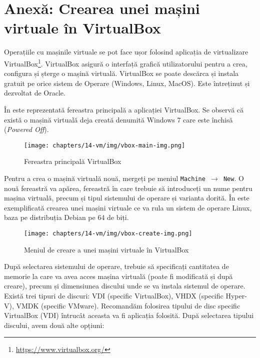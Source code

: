 \section{Anexă: Crearea unei mașini virtuale în VirtualBox}
\label{sec:vm:create-vbox}

Operațiile cu mașinile virtuale se pot face ușor folosind aplicația de virtualizare VirtualBox\footnote{\url{https://www.virtualbox.org/}}.
VirtualBox asigură o interfață grafică utilizatorului pentru a crea, configura și șterge o mașină virtuală.
VirtualBox se poate descărca și instala gratuit pe orice sistem de Operare (Windows, Linux, MacOS).
Este întreținut și dezvoltat de Oracle.

În  este reprezentată fereastra principală a aplicației VirtualBox.
Se observă că există o mașină virtuală deja creată denumită Windows 7 care este închisă (\textit{Powered Off}).

\begin{figure}[!htbp]
  \centering
  \texttt{[image: chapters/14-vm/img/vbox-main-img.png]}
  \caption{Fereastra principală VirtualBox}
  \label{fig:vm:vbox-main}
\end{figure}

Pentru a crea o mașină virtuală nouă, mergeți pe meniul \texttt{Machine $\rightarrow$ New}.
O nouă fereastră va apărea, fereastră în care trebuie să introduceți un nume pentru mașina virtuală, precum și tipul sistemului de operare și varianta dorită.
În  este exemplificată crearea unei mașini virtuale ce va rula un sistem de operare Linux, baza pe distribuția Debian pe 64 de biți.

\begin{figure}[!htbp]
  \centering
  \texttt{[image: chapters/14-vm/img/vbox-create-img.png]}
  \caption{Meniul de creare a unei mașini virtuale în VirtualBox}
  \label{fig:vm:vbox-create}
\end{figure}

După selectarea sistemului de operare, trebuie să specificați cantitatea de memorie la care va avea acces mașina virtuală (poate fi modificată și după creare), precum și dimensiunea discului unde se va instala sistemul de operare.
 Există trei tipuri de discuri: VDI (specific VirtualBox), VHDX (specific Hyper-V), VMDK (specific VMware).
Recomandăm folosirea tipului de disc specific VirtualBox (VDI) întrucât aceasta va fi aplicația folosită.
După selectarea tipului discului, avem două alte opțiuni:

